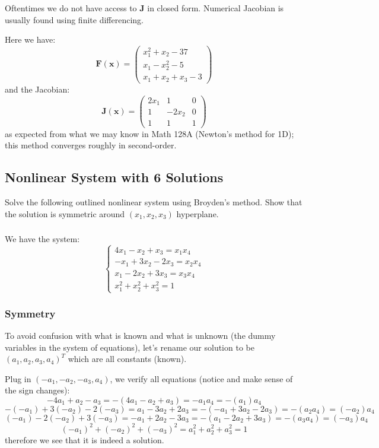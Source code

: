 \documentclass[12pt]{article} %
\newcommand{\1}[1]{\mathds{1}\left[#1\right]}
\begin{document}
Oftentimes we do not have access to $\mathbf{J}$ in closed form. Numerical Jacobian is usually found using finite differencing.

Here we have:
$$
	\mathbf{F}(\mathbf{x}) = 
	\begin{pmatrix}
		x_1^2 + x_2 - 37\\
		x_1-x_2^2 - 5\\
		x_1+x_2+x_3-3
	\end{pmatrix}
$$ and the Jacobian:
$$
	\mathbf{J}(\mathbf{x}) = 
	\begin{pmatrix}
		2x_1 & 1 & 0\\
		1 & -2x_2 & 0\\
		1 & 1 & 1
	\end{pmatrix}
$$ as expected from what we may know in Math 128A (Newton's method for 1D); this method converges roughly in second-order.



\newpage
\subsection{Nonlinear System with 6 Solutions}
Solve the following outlined nonlinear system using Broyden's method. Show that the solution is symmetric around $(x_1,x_2,x_3)$ hyperplane.
\subsubsection{}
We have the system:
$$
	\begin{cases}
		4x_1 - x_2 + x_3=x_1x_4\\
		-x_1+3x_2-2x_3 =x_2x_4\\
		x_1-2x_2+3x_3 = x_3x_4\\
		x_1^2+x_2^2+x_3^2=1
	\end{cases}
$$
\subsubsection{Symmetry}
To avoid confusion with what is known and what is unknown (the dummy variables in the system of equations), let's rename our solution to be $(a_1, a_2, a_3, a_4)^T$ which are all constants (known).

Plug in $(-a_1, -a_2, -a_3, a_4)$, we verify all equations (notice and make sense of the sign changes):
$$
-4a_1 +a_2-a_3 = -(4a_1 - a_2 + a_3) = -a_1a_4 = -(a_1)a_4
$$
$$
	-(-a_1) + 3(-a_2) - 2(-a_3) = a_1 -3a_2+2a_3 = -(-a_1+3a_2-2a_3) = -(a_2a_4) = (-a_2)a_4
$$
$$
	(-a_1) -2(-a_2)+3(-a_3) = -a_1+2a_2-3a_3 = -(a_1-2a_2+3a_3) = -(a_3a_4) = (-a_3)a_4
$$
$$
	(-a_1)^2 + (-a_2)^2+(-a_3)^2 = a_1^2+a_2^2+a_3^2=1
$$ therefore we see that it is indeed a solution.
\end{document}
